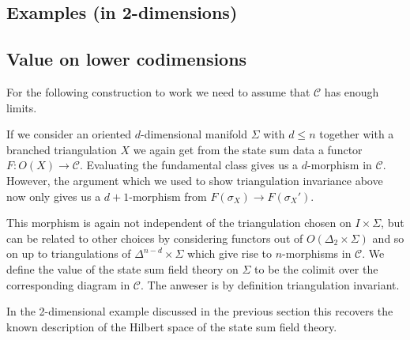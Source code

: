 \subsection{Examples (in 2-dimensions)}
\subsection{Value on lower codimensions}
For the following construction to work we need to assume that $\mathcal{C}$ has enough limits.

If we consider an oriented $d$-dimensional manifold $\Sigma$ with $d\leq n$ together with a  branched triangulation $X$ we again get from the state sum data a functor $F\colon O(X)\longrightarrow \mathcal{C}$.
Evaluating the fundamental class gives us a $d$-morphism in
$\mathcal{C}$.
However, the argument which we used to show triangulation invariance above now only gives us a $d+1$-morphism from $F(\sigma_X)\longrightarrow  F(\sigma_X')$.

This morphism is again not independent of the triangulation chosen on $I\times \Sigma $, but can be related to other choices by considering functors out of $O(\Delta_2 \times \Sigma)$ and so on up to triangulations of $\Delta^{n-d}\times \Sigma $ which give rise to $n$-morphisms in $\mathcal{C}$.
We define the value of the state sum field theory on $\Sigma$ to be the colimit over the corresponding diagram in $\mathcal{C}$.
The anweser is by definition triangulation invariant.


In the 2-dimensional example discussed in the previous section this recovers the known description of the Hilbert space of the state sum field theory.
